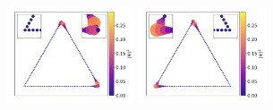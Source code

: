 \documentclass[xcolor=dvipsnames,10pt,aspectratio=169]{beamer}
\begin{document}
\begin{frame}
\begin{figure}
      \pause
      \includegraphics[height=80pt]{./figures/GS-T-Circle.pdf}\hspace{-25pt}
      \pause
      \includegraphics[height=80pt]{./figures/GS-T-Diamond.pdf}
    \end{figure}
  \end{frame}
\end{document}
